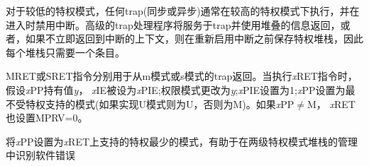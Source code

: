 \iffalse
\begin{commentary}
For lower privilege modes, any trap (synchronous or asynchronous) is
usually taken at a higher privilege mode with interrupts disabled upon entry.
The higher-level trap handler will either service the trap and return
using the stacked information, or, if not returning immediately to the
interrupted context, will save the privilege stack before re-enabling
interrupts, so only one entry per stack is required.
\end{commentary}
\fi

\begin{commentary}
对于较低的特权模式，任何trap(同步或异步)通常在较高的特权模式下执行，并在进入时禁用中断。高级的trap处理程序将服务于trap并使用堆叠的信息返回，或者，如果不立即返回到中断的上下文，则在重新启用中断之前保存特权堆栈，因此每个堆栈只需要一个条目。
\end{commentary}

\iffalse
An MRET or SRET instruction is used to return from
a trap in M-mode or S-mode respectively.  When
executing an {\em x}\/RET instruction, supposing {\em x}\/PP holds the
value {\em y}, {\em x}\/IE is set to {\em x}\/PIE; the privilege mode
is changed to {\em y}; {\em x}\/PIE is set to 1; and {\em x}\/PP is
set to the least-privileged supported mode (U if U-mode is implemented, else M).
If {\em x}\/PP$\neq$M, {\em x}\/RET also sets MPRV=0.
\fi

MRET或SRET指令分别用于从m模式或s模式的trap返回。当执行{\em x}\/RET指令时，假设{\em x}\/PP持有值{\em y}， {\em x}\/IE被设为{\em x}\/PIE;权限模式更改为{\em y};{\em x}\/PIE设置为1;{\em x}\/PP设置为最不受特权支持的模式(如果实现U模式则为U，否则为M)。如果{\em x}\/PP$\neq$M， {\em x}\/RET也设置MPRV=0。

\iffalse
\begin{commentary}
Setting {\em x}\/PP to the least-privileged supported mode on an {\em x}\/RET
helps identify software bugs in the management of the two-level privilege-mode
stack.
\end{commentary}
\fi

\begin{commentary}
将{\em x}\/PP设置为{\em x}\/RET上支持的特权最少的模式，有助于在两级特权模式堆栈的管理中识别软件错误
\end{commentary}

\iffalse
{\em x}\/PP fields are \warl\ fields that can hold only privilege mode {\em x}
and any implemented privilege mode lower than {\em x}.  If privilege mode {\em
x} is not implemented, then {\em x}\/PP must be read-only~0.
\fi

